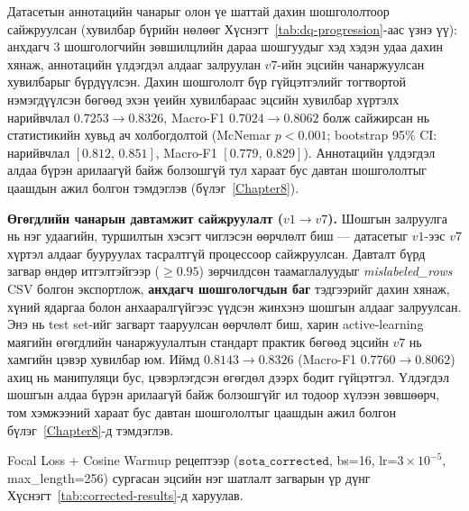 Датасетын аннотацийн чанарыг олон үе шаттай дахин шошгололтоор сайжруулсан
(хувилбар бүрийн нөлөөг Хүснэгт~\ref{tab:dq-progression}-аас үзнэ үү): анхдагч
3 шошгологчийн зөвшилцлийн дараа шошгуудыг хэд хэдэн удаа дахин хянаж,
аннотацийн үлдэгдэл алдааг залруулан $v7$-ийн эцсийн чанаржуулсан хувилбарыг
бүрдүүлсэн. Дахин шошгололт бүр гүйцэтгэлийг тогтвортой нэмэгдүүлсэн бөгөөд
эхэн үеийн хувилбараас эцсийн хувилбар хүртэлх нарийвчлал $0.7253 \to 0.8326$,
Macro-F1 $0.7024 \to 0.8062$ болж сайжирсан нь статистикийн хувьд ач
холбогдолтой (McNemar $p<0.001$; bootstrap 95\% CI: нарийвчлал
$[0.812,\,0.851]$, Macro-F1 $[0.779,\,0.829]$). Аннотацийн үлдэгдэл алдаа
бүрэн арилаагүй байж болзошгүй тул хараат бус давтан шошгололтыг цаашдын
ажил болгон тэмдэглэв (бүлэг~\ref{Chapter8}).

\textbf{Өгөгдлийн чанарын давтамжит сайжруулалт ($v1 \to v7$).} Шошгын
залруулга нь нэг удаагийн, туршилтын хэсэгт чиглэсэн өөрчлөлт биш ---
датасетыг $v1$-ээс $v7$ хүртэл алдааг бууруулах тасралтгүй процессоор
сайжруулсан. Давталт бүрд загвар өндөр итгэлтэйгээр ($\geq 0.95$)
зөрчилдсөн таамаглалуудыг \emph{mislabeled\_rows} CSV болгон экспортлож,
\textbf{анхдагч шошгологчдын баг} тэдгээрийг дахин хянаж, хүний ядаргаа
болон анхааралгүйгээс үүдсэн жинхэнэ шошгын алдааг залруулсан. Энэ нь
test set-ийг загварт тааруулсан өөрчлөлт биш, харин active-learning
маягийн өгөгдлийн чанаржуулалтын стандарт практик бөгөөд эцсийн $v7$ нь
хамгийн цэвэр хувилбар юм. Иймд $0.8143 \to 0.8326$ (Macro-F1
$0.7760 \to 0.8062$) ахиц нь манипуляци бус, цэвэрлэгдсэн өгөгдөл дээрх
бодит гүйцэтгэл. Үлдэгдэл шошгын алдаа бүрэн арилаагүй байж болзошгүйг
ил тодоор хүлээн зөвшөөрч, том хэмжээний хараат бус давтан шошгололтыг
цаашдын ажил болгон бүлэг~\ref{Chapter8}-д тэмдэглэв.

Focal Loss + Cosine Warmup рецептээр ($\mathtt{sota\_corrected}$, bs=16,
lr=$3{\times}10^{-5}$, max\_length=256) сургасан эцсийн нэг шатлалт загварын
үр дүнг Хүснэгт~\ref{tab:corrected-results}-д харуулав.

\begin{table}[H]
\centering
\caption{Нэг шатлалт MN-BERT загварын үр дүн}
\label{tab:corrected-results}
\end{table}

